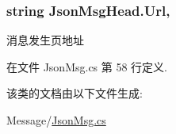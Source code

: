 \hypertarget{class_json_msg_head_a14b84be17a2783df2316a221318cb9f2}{
\subsubsection[{Url}]{\setlength{\rightskip}{0pt plus 5cm}string Json\-Msg\-Head.\-Url\hspace{0.3cm}{\ttfamily [get]}, {\ttfamily [set]}}}\label{class_json_msg_head_a14b84be17a2783df2316a221318cb9f2}


消息发生页地址 



在文件 Json\-Msg.\-cs 第 58 行定义.



该类的文档由以下文件生成\-:\begin{DoxyCompactItemize}
\item 
Message/\hyperlink{_json_msg_8cs}{Json\-Msg.\-cs}\end{DoxyCompactItemize}
